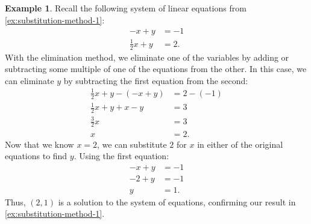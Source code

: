 \documentclass{article}
\theoremstyle{definition}
\newtheorem{example}{Example}
\begin{document}
\begin{example}\label{ex:elimination-method-1}
    Recall the following system of linear equations from \cref{ex:substitution-method-1}:
\begin{align*}
    -x+y&=-1 \\
    \frac{1}{2}x+y&=2.
\end{align*}
With the elimination method, we eliminate one of the variables by adding or subtracting some multiple of one of the equations from the other. In this case, we can eliminate \(y\) by subtracting the first equation from the second:
\begin{align*}
    \frac{1}{2}x+y-(-x+y)&=2-(-1) \\
    \frac{1}{2}x+y+x-y&=3 \\
    \frac{3}{2}x&=3 \\
    x&=2.
\end{align*}
Now that we know \(x=2\), we can substitute \(2\) for \(x\) in either of the original equations to find \(y\). Using the first equation:
\begin{align*}
    -x+y&=-1 \\
    -2+y&=-1 \\
    y&=1.
\end{align*}
Thus, \((2, 1)\) is a solution to the system of equations, confirming our result in \cref{ex:substitution-method-1}.
\end{example}
\end{document}
